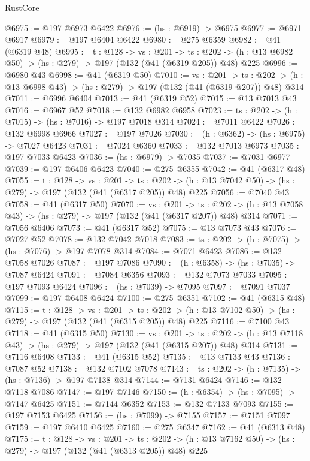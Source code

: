 \begin{lexlean}{RustCore}
\begin{coremodule}
@6975 := @197 @6973 @6422
@6976 := (hs : @6919) -> @6975
@6977 := @6971 @6917
@6979 := @197 @6404 @6422
@6980 := @275 @6359
@6982 := @41 (@6319 @48)
@6995 := {t : @128} ->
  {vs : @201} ->
  {ts : @202} -> (h : @13 @6982 @50) -> (hs : @279) -> @197 (@132 (@41 (@6319 @205)) @48) @225
@6996 := @6980 @43
@6998 := @41 (@6319 @50)
@7010 := {vs : @201} ->
  {ts : @202} -> (h : @13 @6998 @43) -> (hs : @279) -> @197 (@132 (@41 (@6319 @207)) @48) @314
@7011 := @6996 @6404
@7013 := @41 (@6319 @52)
@7015 := @13 @7013 @43
@7016 := @6967 @52
@7018 := @132 @6982 @6958
@7023 := {ts : @202} -> (h : @7015) -> (hs : @7016) -> @197 @7018 @314
@7024 := @7011 @6422
@7026 := @132 @6998 @6966
@7027 := @197 @7026
@7030 := (h : @6362) -> (hs : @6975) -> @7027 @6423
@7031 := @7024 @6360
@7033 := @132 @7013 @6973
@7035 := @197 @7033 @6423
@7036 := (hs : @6979) -> @7035
@7037 := @7031 @6977
@7039 := @197 @6406 @6423
@7040 := @275 @6355
@7042 := @41 (@6317 @48)
@7055 := {t : @128} ->
  {vs : @201} ->
  {ts : @202} -> (h : @13 @7042 @50) -> (hs : @279) -> @197 (@132 (@41 (@6317 @205)) @48) @225
@7056 := @7040 @43
@7058 := @41 (@6317 @50)
@7070 := {vs : @201} ->
  {ts : @202} -> (h : @13 @7058 @43) -> (hs : @279) -> @197 (@132 (@41 (@6317 @207)) @48) @314
@7071 := @7056 @6406
@7073 := @41 (@6317 @52)
@7075 := @13 @7073 @43
@7076 := @7027 @52
@7078 := @132 @7042 @7018
@7083 := {ts : @202} -> (h : @7075) -> (hs : @7076) -> @197 @7078 @314
@7084 := @7071 @6423
@7086 := @132 @7058 @7026
@7087 := @197 @7086
@7090 := (h : @6358) -> (hs : @7035) -> @7087 @6424
@7091 := @7084 @6356
@7093 := @132 @7073 @7033
@7095 := @197 @7093 @6424
@7096 := (hs : @7039) -> @7095
@7097 := @7091 @7037
@7099 := @197 @6408 @6424
@7100 := @275 @6351
@7102 := @41 (@6315 @48)
@7115 := {t : @128} ->
  {vs : @201} ->
  {ts : @202} -> (h : @13 @7102 @50) -> (hs : @279) -> @197 (@132 (@41 (@6315 @205)) @48) @225
@7116 := @7100 @43
@7118 := @41 (@6315 @50)
@7130 := {vs : @201} ->
  {ts : @202} -> (h : @13 @7118 @43) -> (hs : @279) -> @197 (@132 (@41 (@6315 @207)) @48) @314
@7131 := @7116 @6408
@7133 := @41 (@6315 @52)
@7135 := @13 @7133 @43
@7136 := @7087 @52
@7138 := @132 @7102 @7078
@7143 := {ts : @202} -> (h : @7135) -> (hs : @7136) -> @197 @7138 @314
@7144 := @7131 @6424
@7146 := @132 @7118 @7086
@7147 := @197 @7146
@7150 := (h : @6354) -> (hs : @7095) -> @7147 @6425
@7151 := @7144 @6352
@7153 := @132 @7133 @7093
@7155 := @197 @7153 @6425
@7156 := (hs : @7099) -> @7155
@7157 := @7151 @7097
@7159 := @197 @6410 @6425
@7160 := @275 @6347
@7162 := @41 (@6313 @48)
@7175 := {t : @128} ->
  {vs : @201} ->
  {ts : @202} -> (h : @13 @7162 @50) -> (hs : @279) -> @197 (@132 (@41 (@6313 @205)) @48) @225

\end{coremodule}
\end{lexlean}
